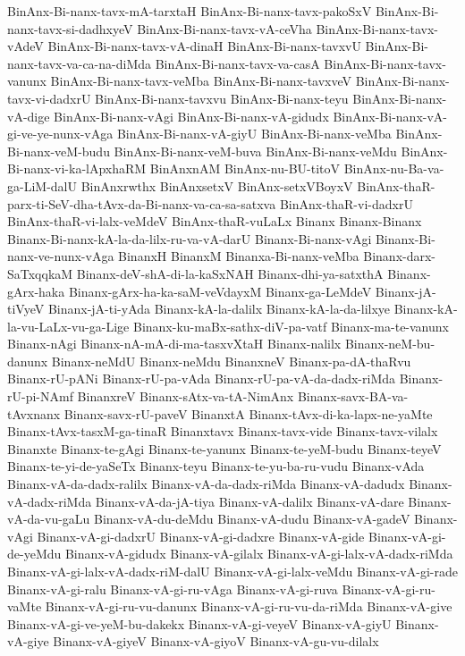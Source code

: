 {BinAnx-Bi-nanx-tavx-mA-tarxtaH
BinAnx-Bi-nanx-tavx-pakoSxV
BinAnx-Bi-nanx-tavx-si-dadhxyeV
BinAnx-Bi-nanx-tavx-vA-ceVha
BinAnx-Bi-nanx-tavx-vAdeV
BinAnx-Bi-nanx-tavx-vA-dinaH
BinAnx-Bi-nanx-tavxvU
BinAnx-Bi-nanx-tavx-va-ca-na-diMda
BinAnx-Bi-nanx-tavx-va-casA
BinAnx-Bi-nanx-tavx-vanunx
BinAnx-Bi-nanx-tavx-veMba
BinAnx-Bi-nanx-tavxveV
BinAnx-Bi-nanx-tavx-vi-dadxrU
BinAnx-Bi-nanx-tavxvu
BinAnx-Bi-nanx-teyu
BinAnx-Bi-nanx-vA-dige
BinAnx-Bi-nanx-vAgi
BinAnx-Bi-nanx-vA-gidudx
BinAnx-Bi-nanx-vA-gi-ve-ye-nunx-vAga
BinAnx-Bi-nanx-vA-giyU
BinAnx-Bi-nanx-veMba
BinAnx-Bi-nanx-veM-budu
BinAnx-Bi-nanx-veM-buva
BinAnx-Bi-nanx-veMdu
BinAnx-Bi-nanx-vi-ka-lApxhaRM
BinAnxnAM
BinAnx-nu-BU-titoV
BinAnx-nu-Ba-va-ga-LiM-dalU
BinAnxrwthx
BinAnxsetxV
BinAnx-setxVBoyxV
BinAnx-thaR-parx-ti-SeV-dha-tAvx-da-Bi-nanx-va-ca-sa-satxva
BinAnx-thaR-vi-dadxrU
BinAnx-thaR-vi-lalx-veMdeV
BinAnx-thaR-vuLaLx
Binanx
Binanx-Binanx
Binanx-Bi-nanx-kA-la-da-lilx-ru-va-vA-darU
Binanx-Bi-nanx-vAgi
Binanx-Bi-nanx-ve-nunx-vAga
BinanxH
BinanxM
Binanxa-Bi-nanx-veMba
Binanx-darx-SaTxqqkaM
Binanx-deV-shA-di-la-kaSxNAH
Binanx-dhi-ya-satxthA
Binanx-gArx-haka
Binanx-gArx-ha-ka-saM-veVdayxM
Binanx-ga-LeMdeV
Binanx-jA-tiVyeV
Binanx-jA-ti-yAda
Binanx-kA-la-dalilx
Binanx-kA-la-da-lilxye
Binanx-kA-la-vu-LaLx-vu-ga-Lige
Binanx-ku-maBx-sathx-diV-pa-vatf
Binanx-ma-te-vanunx
Binanx-nAgi
Binanx-nA-mA-di-ma-tasxvXtaH
Binanx-nalilx
Binanx-neM-bu-danunx
Binanx-neMdU
Binanx-neMdu
BinanxneV
Binanx-pa-dA-thaRvu
Binanx-rU-pANi
Binanx-rU-pa-vAda
Binanx-rU-pa-vA-da-dadx-riMda
Binanx-rU-pi-NAmf
BinanxreV
Binanx-sAtx-va-tA-NimAnx
Binanx-savx-BA-va-tAvxnanx
Binanx-savx-rU-paveV
BinanxtA
Binanx-tAvx-di-ka-lapx-ne-yaMte
Binanx-tAvx-tasxM-ga-tinaR
Binanxtavx
Binanx-tavx-vide
Binanx-tavx-vilalx
Binanxte
Binanx-te-gAgi
Binanx-te-yanunx
Binanx-te-yeM-budu
Binanx-teyeV
Binanx-te-yi-de-yaSeTx
Binanx-teyu
Binanx-te-yu-ba-ru-vudu
Binanx-vAda
Binanx-vA-da-dadx-ralilx
Binanx-vA-da-dadx-riMda
Binanx-vA-dadudx
Binanx-vA-dadx-riMda
Binanx-vA-da-jA-tiya
Binanx-vA-dalilx
Binanx-vA-dare
Binanx-vA-da-vu-gaLu
Binanx-vA-du-deMdu
Binanx-vA-dudu
Binanx-vA-gadeV
Binanx-vAgi
Binanx-vA-gi-dadxrU
Binanx-vA-gi-dadxre
Binanx-vA-gide
Binanx-vA-gi-de-yeMdu
Binanx-vA-gidudx
Binanx-vA-gilalx
Binanx-vA-gi-lalx-vA-dadx-riMda
Binanx-vA-gi-lalx-vA-dadx-riM-dalU
Binanx-vA-gi-lalx-veMdu
Binanx-vA-gi-rade
Binanx-vA-gi-ralu
Binanx-vA-gi-ru-vAga
Binanx-vA-gi-ruva
Binanx-vA-gi-ru-vaMte
Binanx-vA-gi-ru-vu-danunx
Binanx-vA-gi-ru-vu-da-riMda
Binanx-vA-give
Binanx-vA-gi-ve-yeM-bu-dakekx
Binanx-vA-gi-veyeV
Binanx-vA-giyU
Binanx-vA-giye
Binanx-vA-giyeV
Binanx-vA-giyoV
Binanx-vA-gu-vu-dilalx
}

